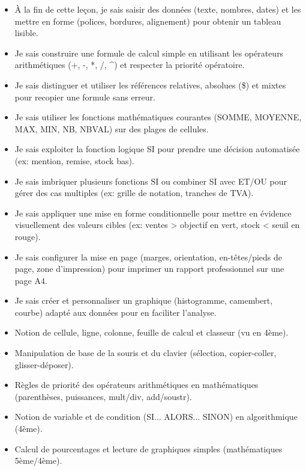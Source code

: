 \documentclass[11pt]{article}
\begin{document}
\begin{objectifs}
\begin{itemize}
\item À la fin de cette leçon, je sais saisir des données (texte, nombres, dates) et les mettre en forme (polices, bordures, alignement) pour obtenir un tableau lisible.
\item Je sais construire une formule de calcul simple en utilisant les opérateurs arithmétiques (+, -, *, /, \^{}) et respecter la priorité opératoire.
\item Je sais distinguer et utiliser les références relatives, absolues (\$) et mixtes pour recopier une formule sans erreur.
\item Je sais utiliser les fonctions mathématiques courantes (SOMME, MOYENNE, MAX, MIN, NB, NBVAL) sur des plages de cellules.
\item Je sais exploiter la fonction logique SI pour prendre une décision automatisée (ex: mention, remise, stock bas).
\item Je sais imbriquer plusieurs fonctions SI ou combiner SI avec ET/OU pour gérer des cas multiples (ex: grille de notation, tranches de TVA).
\item Je sais appliquer une mise en forme conditionnelle pour mettre en évidence visuellement des valeurs cibles (ex: ventes > objectif en vert, stock < seuil en rouge).
\item Je sais configurer la mise en page (marges, orientation, en-têtes/pieds de page, zone d'impression) pour imprimer un rapport professionnel sur une page A4.
\item Je sais créer et personnaliser un graphique (histogramme, camembert, courbe) adapté aux données pour en faciliter l'analyse.
\end{itemize}
\end{objectifs}

\begin{prerequis}
\begin{itemize}
\item Notion de cellule, ligne, colonne, feuille de calcul et classeur (vu en 4ème).
\item Manipulation de base de la souris et du clavier (sélection, copier-coller, glisser-déposer).
\item Règles de priorité des opérateurs arithmétiques en mathématiques (parenthèses, puissances, mult/div, add/soustr).
\item Notion de variable et de condition (SI... ALORS... SINON) en algorithmique (4ème).
\item Calcul de pourcentages et lecture de graphiques simples (mathématiques 5ème/4ème).
\end{itemize}
\end{prerequis}
\end{document}
